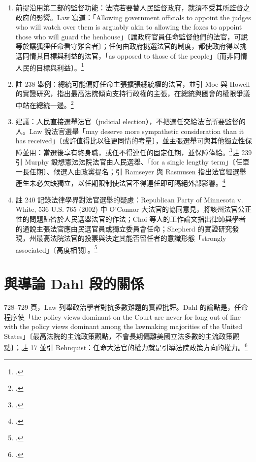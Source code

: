 \begin{enumerate}
\tightlist
\item
  前提沿用第二部的監督功能：法院若要替人民監督政府，就須不受其所監督之政府的影響。Law 寫道：「Allowing government officials to appoint the judges who will watch over them is arguably akin to allowing the foxes to appoint those who will guard the henhouse」〔讓政府官員任命監督他們的法官，可說等於讓狐狸任命看守雞舍者〕；任何由政府挑選法官的制度，都使政府得以挑選同情其目標與利益的法官，「as opposed to those of the people」〔而非同情人民的目標與利益〕。\footcite[798]{law2009}
\item
  註 238 舉例：總統可能偏好任命主張擴張總統權的法官，並引 Moe 與 Howell 的實證研究，指出最高法院傾向支持行政權的主張，在總統與國會的權限爭議中站在總統一邊。\footcite[798 n.238]{law2009}
\item
  建議：人民直接選舉法官（judicial election），不把選任交給法官所要監督的人。Law 說法官選舉「may deserve more sympathetic consideration than it has received」〔或許值得比以往更同情的考量〕，並主張選舉可與其他獨立性保障並用：當選後享有終身職，或任不得連任的固定任期，並保障俸給。\footcite[798]{law2009}註 239 引 Murphy 設想憲法法院法官由人民選舉、「for a single lengthy term」〔任單一長任期〕、候選人由政黨提名；引 Ramseyer 與 Rasmusen 指出法官經選舉產生未必欠缺獨立，以任期限制使法官不得連任即可隔絕外部影響。\footcite[798 n.239]{law2009}
\item
  註 240 記錄法律學界對法官選舉的疑慮：Republican Party of Minnesota v. White, 536 U.S. 765 (2002) 中 O'Connor 大法官的協同意見，將該州法官公正性的問題歸咎於人民選舉法官的作法；Choi 等人的工作論文指出律師與學者的通說主張法官應由民選官員或獨立委員會任命；Shepherd 的實證研究發現，州最高法院法官的投票與決定其能否留任者的意識形態「strongly associated」〔高度相關〕。\footcite[798 n.240]{law2009}
\end{enumerate}

\section{與導論 Dahl 段的關係}
\label{sec:40_selection-3}

728--729 頁，Law 列舉政治學者對抗多數難題的實證批評。Dahl 的論點是，任命程序使「the policy views dominant on the Court are never for long out of line with the policy views dominant among the lawmaking majorities of the United States」〔最高法院的主流政策觀點，不會長期偏離美國立法多數的主流政策觀點〕；註 17 並引 Rehnquist：任命大法官的權力就是引導法院政策方向的權力。\footcite[728--729 \& n.17]{law2009}


